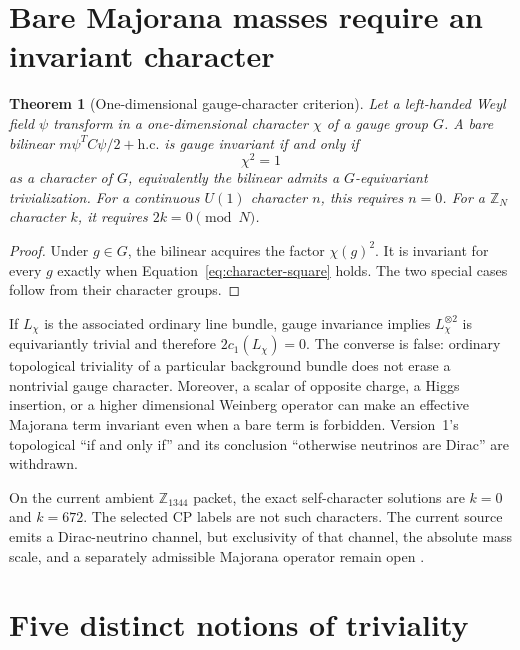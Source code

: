 \documentclass[11pt]{article}
\theoremstyle{plain}
\newtheorem{theorem}{Theorem}[section]
\theoremstyle{definition}
\theoremstyle{remark}
\newcommand{\Z}{\mathbb{Z}}
\begin{document}
\section{Bare Majorana masses require an invariant character}

\begin{theorem}[One-dimensional gauge-character criterion]
\label{thm:majorana-character}
Let a left-handed Weyl field $\psi$ transform in a one-dimensional character
$\chi$ of a gauge group $G$. A bare bilinear
$m\psi^T C\psi/2+\mathrm{h.c.}$ is gauge invariant if and only if
\begin{equation}
 \chi^2=1
 \label{eq:character-square}
\end{equation}
as a character of $G$, equivalently the bilinear admits a
$G$-equivariant trivialization. For a continuous $U(1)$ character $n$, this
requires $n=0$. For a $\Z_N$ character $k$, it requires
$2k=0\pmod N$.
\end{theorem}

\begin{proof}
Under $g\in G$, the bilinear acquires the factor $\chi(g)^2$. It is invariant
for every $g$ exactly when Equation~\eqref{eq:character-square} holds. The two
special cases follow from their character groups.
\end{proof}

If $L_\chi$ is the associated ordinary line bundle, gauge invariance implies
$L_\chi^{\otimes2}$ is equivariantly trivial and therefore
$2c_1(L_\chi)=0$. The converse is false: ordinary topological triviality of a
particular background bundle does not erase a nontrivial gauge character.
Moreover, a scalar of opposite charge, a Higgs insertion, or a higher
dimensional Weinberg operator can make an effective Majorana term invariant
even when a bare term is forbidden. Version~1's topological ``if and only if''
and its conclusion ``otherwise neutrinos are Dirac'' are withdrawn.

On the current ambient $\Z_{1344}$ packet, the exact self-character solutions
are $k=0$ and $k=672$. The selected CP labels are not such characters. The
current source emits a Dirac-neutrino channel, but exclusivity of that channel,
the absolute mass scale, and a separately admissible Majorana operator remain
open \cite{MTTNeutrinoCP}.

\section{Five distinct notions of triviality}
\end{document}
